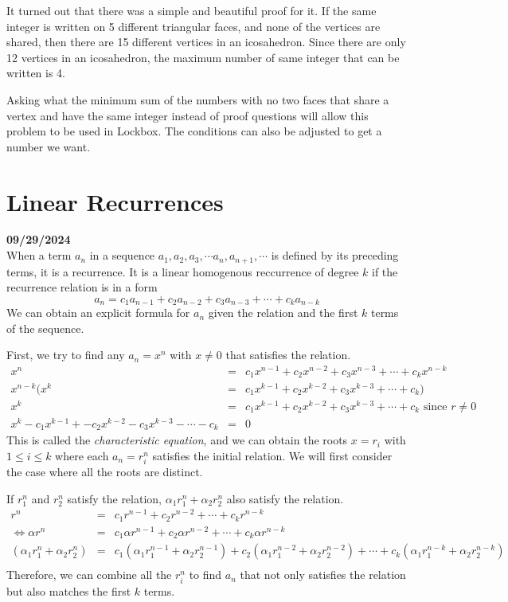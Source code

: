 \documentclass[12pt, oneside]{article}
\begin{document}
It turned out that there was a simple and beautiful proof for it. If the same integer is written on 5 different triangular faces, and none of the vertices are shared, then there are 15 different vertices in an icosahedron. Since there are only 12 vertices in an icosahedron,  the maximum number of same integer that can be written is 4.

Asking what the minimum sum of the numbers with no two faces that share a vertex and have the same integer instead of proof questions will allow this problem to be used in Lockbox. The conditions can also be adjusted to get a number we want.
\section*{Linear Recurrences}
\textbf{09/29/2024}\\
When a term $a_n$ in a sequence $a_1, a_2, a_3, \cdots a_n, a_{n+1}, \cdots$ is defined by its preceding terms, it is a recurrence. It is a linear homogenous reccurrence of degree $k$ if the recurrence relation is in a form \[a_n = c_1a_{n-1} +  c_2a_{n-2} + c_3a_{n-3} + \cdots + c_ka_{n-k}\]  We can obtain an explicit formula for $a_n$ given the relation and the first $k$ terms of the sequence. 

First, we try to find any $a_n = x^n$ with $x \neq 0$ that satisfies the relation. 
\begin{eqnarray*}
x^n & = & c_1x^{n-1} +  c_2x^{n-2} + c_3x^{n-3} + \cdots + c_kx^{n-k}\\
x^{n-k}(x^k & = & c_1x^{k-1} +  c_2x^{k-2} + c_3x^{k-3} + \cdots + c_k)\\
x^k & = & c_1x^{k-1} +  c_2x^{k-2} + c_3x^{k-3} + \cdots + c_k \text{ since } r \neq 0\\
x^k - c_1x^{k-1} +- c_2x^{k-2} - c_3x^{k-3} - \cdots - c_k &=& 0
\end{eqnarray*}
This is called the \emph{characteristic equation}, and we can obtain the roots $x=r_i$ with  $1 \leq i \leq k$ where each $a_n = r_i^n$ satisfies the initial relation. We will first consider the case where all the roots are distinct.

If $r_1^n$ and $r_2^n$ satisfy the relation, $\alpha_1 r_1^n + \alpha_2 r_2^n$ also satisfy the relation. 
\begin{eqnarray*}
r^n & = & c_1r^{n-1} +  c_2r^{n-2} + \cdots + c_kr^{n-k}\\
\Leftrightarrow \alpha r^n & = & c_1\alpha r^{n-1} +  c_2\alpha r^{n-2} + \cdots + c_k\alpha r^{n-k}\\
(\alpha_1 r_1^n + \alpha_2 r_2^n) & = & c_1(\alpha_1 r_1^{n-1} + \alpha_2 r_2^{n-1}) +  c_2(\alpha_1 r_1^{n-2} + \alpha_2 r_2^{n-2}) + \cdots + c_k(\alpha_1 r_1^{n-k} + \alpha_2 r_2^{n-k})\\
\end{eqnarray*}
Therefore, we can combine all the $r_i^n$ to find $a_n$ that not only satisfies the relation but also matches the first $k$ terms.
\end{document}
